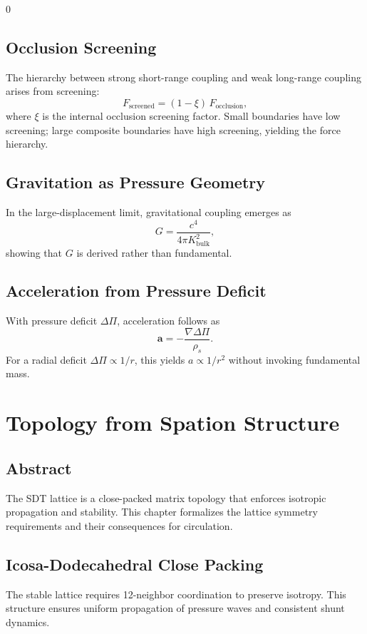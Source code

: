 0\documentclass[12pt]{book}
\begin{document}
\section{Occlusion Screening}
The hierarchy between strong short-range coupling and weak long-range coupling arises from screening:
\begin{equation}
F_{\text{screened}} = (1-\xi)\,F_{\text{occlusion}},
\end{equation}
where $\xi$ is the internal occlusion screening factor. Small boundaries have low screening; large composite
boundaries have high screening, yielding the force hierarchy.

\section{Gravitation as Pressure Geometry}
In the large-displacement limit, gravitational coupling emerges as
\begin{equation}
G = \frac{c^4}{4\pi K_{\text{bulk}}^2},
\end{equation}
showing that $G$ is derived rather than fundamental.

\section{Acceleration from Pressure Deficit}
With pressure deficit $\Delta \Pi$, acceleration follows as
\begin{equation}
\mathbf{a} = -\frac{\nabla \Delta \Pi}{\rho_s}.
\end{equation}
For a radial deficit $\Delta \Pi \propto 1/r$, this yields $a \propto 1/r^2$ without invoking fundamental mass.

\chapter{Topology from Spation Structure}

\section*{Abstract}
The SDT lattice is a close-packed matrix topology that enforces isotropic propagation and stability.
This chapter formalizes the lattice symmetry requirements and their consequences for circulation.

\section{Icosa-Dodecahedral Close Packing}
The stable lattice requires 12-neighbor coordination to preserve isotropy. This structure ensures
uniform propagation of pressure waves and consistent shunt dynamics.
\end{document}
